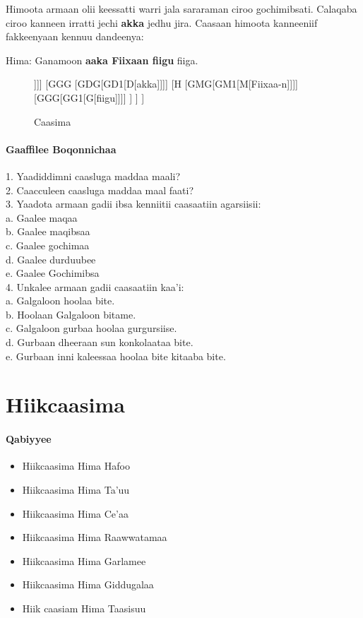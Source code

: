 \documentclass[11pt,b5paper]{book}
\begin{document}
Himoota armaan olii keessatti warri jala sararaman ciroo gochimibsati. Calaqaba ciroo kanneen irratti jechi \textbf{akka} jedhu jira. Caasaan himoota kanneeniif fakkeenyaan kennuu dandeenya: 

Hima: Ganamoon \textbf{aaka Fiixaan fiigu} fiiga.


\begin{figure}[H]
	\caption{Caasima}
	\centering
	\begin{forest}
		[H
			[GMG [GM1[M[Ganamoo-n]]]]
			[GGG
				[GDG[GD1[D[akka]]]]
				[H
					[GMG[GM1[M[Fiixaa-n]]]]
					[GGG[GG1[G[fiigu]]]]
				]
			]
		]
	\end{forest}
\end{figure}

\subsubsection{Gaaffilee Boqonnichaa }

1. Yaadiddimni caasluga maddaa maali?\\
2. Caacculeen caasluga maddaa maal faati?\\
3. Yaadota armaan gadii ibsa kenniitii caasaatiin agarsiisii:\\
	a. Gaalee maqaa\\
	b. Gaalee maqibsaa\\
	c. Gaalee gochimaa\\
	d. Gaalee durduubee\\
	e. Gaalee Gochimibsa\\
4. Unkalee armaan gadii caasaatiin kaa’i:\\
	a. Galgaloon hoolaa bite.\\
	b. Hoolaan Galgaloon bitame.\\
	c. Galgaloon gurbaa hoolaa gurgursiise.\\
	d. Gurbaan dheeraan sun konkolaataa bite.\\
	e. Gurbaan inni kaleessaa hoolaa bite kitaaba bite.
	
	\newpage
	
\chapter{Hiikcaasima}

\subsubsection{Qabiyyee}
\begin{itemize}
	\item Hiikcaasima Hima Hafoo
	\item Hiikcaasima Hima Ta'uu
	\item Hiikcaasima Hima Ce'aa
	\item Hiikcaasima Hima Raawwatamaa
	\item Hiikcaasima Hima Garlamee
	\item Hiikcaasima Hima Giddugalaa
	\item Hiik caasiam Hima Taasisuu
\end{itemize}
\end{document}
